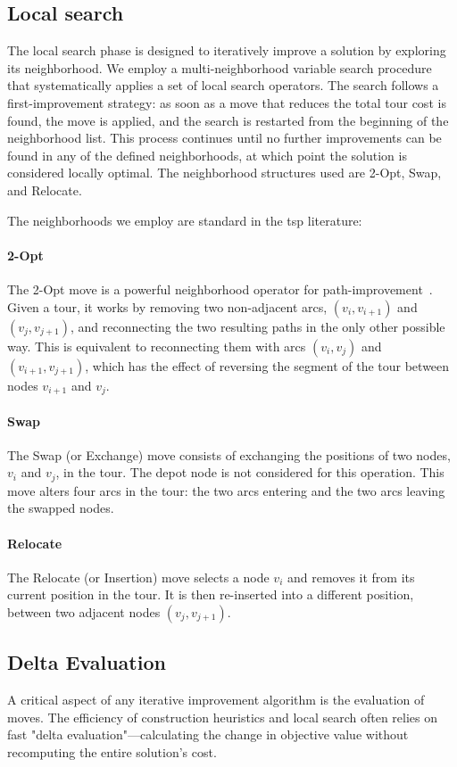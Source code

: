 \documentclass[twocolumn, switch]{article} %
\begin{document}
\subsection{Local search}
The local search phase is designed to iteratively improve a solution by exploring its neighborhood. We employ a multi-neighborhood variable search procedure that systematically applies a set of local search operators. The search follows a first-improvement strategy: as soon as a move that reduces the total tour cost is found, the move is applied, and the search is restarted from the beginning of the neighborhood list. This process continues until no further improvements can be found in any of the defined neighborhoods, at which point the solution is considered locally optimal. The neighborhood structures used are 2-Opt, Swap, and Relocate.

The neighborhoods we employ are standard in the \gls{tsp} literature:

\paragraph{2-Opt} The 2-Opt move is a powerful neighborhood operator for path-improvement~\cite{Croes1958}. Given a tour, it works by removing two non-adjacent arcs, $(v_i, v_{i+1})$ and $(v_j, v_{j+1})$, and reconnecting the two resulting paths in the only other possible way. This is equivalent to reconnecting them with arcs $(v_i, v_j)$ and $(v_{i+1}, v_{j+1})$, which has the effect of reversing the segment of the tour between nodes $v_{i+1}$ and $v_j$.

\paragraph{Swap} The Swap (or Exchange) move consists of exchanging the positions of two nodes, $v_i$ and $v_j$, in the tour. The depot node is not considered for this operation. This move alters four arcs in the tour: the two arcs entering and the two arcs leaving the swapped nodes.

\paragraph{Relocate} The Relocate (or Insertion) move selects a node $v_i$ and removes it from its current position in the tour. It is then re-inserted into a different position, between two adjacent nodes $(v_j, v_{j+1})$.

\subsection{Delta Evaluation}
A critical aspect of any iterative improvement algorithm is the evaluation of moves. The efficiency of construction heuristics and local search often relies on fast "delta evaluation"—calculating the change in objective value without recomputing the entire solution's cost.
\end{document}
